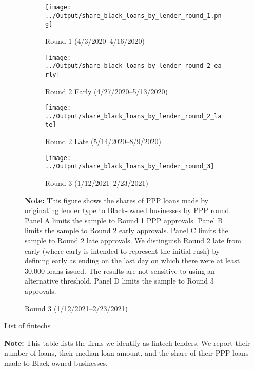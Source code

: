\documentclass[11pt]{article}
\begin{document}
\newpage
\begin{figure}[H]
	\caption{\textbf{Black-Owned Business PPP Lending by Institution Type and Round}} \label{f:round_nocontrols}
	\centering
	\begin{subfigure}[b]{0.5\textwidth}
		\caption{Round 1 (4/3/2020--4/16/2020)}
		\centering
		\texttt{[image: ../Output/share\_black\_loans\_by\_lender\_round\_1.png]}
		\vspace{0.5cm}
	\end{subfigure}%
	\hfill%
	\begin{subfigure}[b]{0.5\textwidth}
		\caption{Round 2 Early (4/27/2020--5/13/2020)}
		\centering
		\texttt{[image: ../Output/share\_black\_loans\_by\_lender\_round\_2\_early]}
		\vspace{0.5cm}
	\end{subfigure}

	\begin{subfigure}[b]{0.5\textwidth}
		 \caption{Round 2 Late (5/14/2020--8/9/2020)}
		 \centering
		 \texttt{[image: ../Output/share\_black\_loans\_by\_lender\_round\_2\_late]}
	\end{subfigure}%
	\hfill%
	\begin{subfigure}[b]{0.5\textwidth}
		\caption{Round 3 (1/12/2021--2/23/2021)}
		\centering
		\texttt{[image: ../Output/share\_black\_loans\_by\_lender\_round\_3]}
	\end{subfigure}

	\begin{minipage}{\textwidth} \medskip
		\footnotesize{{\bf Note: }This figure shows the shares of PPP loans made by originating lender type to Black-owned businesses by PPP round. Panel A limits the sample to Round 1 PPP approvals. Panel B limits the sample to Round 2 early approvals. Panel C limits the sample to Round 2 late approvals. We distinguish Round 2 late from early (where early is intended to represent the initial rush) by defining early as ending on the last day on which there were at least 30,000 loans issued. The results are not sensitive to using an alternative threshold. Panel D limits the sample to Round 3 approvals.}
	\end{minipage}
\end{figure}



\newpage
\begin{table}[H]
	\caption{List of fintechs} \label{t_stats_fintech}
	\begin{adjustbox}{width=\linewidth, center}
		
	\end{adjustbox}

	\begin{minipage}{\textwidth} \medskip
		\footnotesize{{\bf Note: }This table lists the firms we identify as fintech lenders. We report their number of loans, their median loan amount, and the share of their PPP loans made to Black-owned businesses.}
	\end{minipage}
\end{table}
\end{document}
